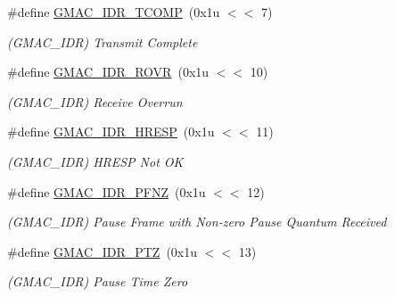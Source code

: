 \begin{DoxyCompactItemize}
\mbox{\label{group__SAMV71__GMAC_ga66627979744c990f93143b1dfcd2f9b6}} 
\#define \mbox{\hyperlink{group__SAMV71__GMAC_ga66627979744c990f93143b1dfcd2f9b6}{G\+M\+A\+C\+\_\+\+I\+D\+R\+\_\+\+T\+C\+O\+MP}}~(0x1u $<$$<$ 7)
\begin{DoxyCompactList}\small\item\em (G\+M\+A\+C\+\_\+\+I\+DR) Transmit Complete \end{DoxyCompactList}\item 
\mbox{\label{group__SAMV71__GMAC_ga6babb73eca9b6745dac4d0be12d2d8d1}} 
\#define \mbox{\hyperlink{group__SAMV71__GMAC_ga6babb73eca9b6745dac4d0be12d2d8d1}{G\+M\+A\+C\+\_\+\+I\+D\+R\+\_\+\+R\+O\+VR}}~(0x1u $<$$<$ 10)
\begin{DoxyCompactList}\small\item\em (G\+M\+A\+C\+\_\+\+I\+DR) Receive Overrun \end{DoxyCompactList}\item 
\mbox{\label{group__SAMV71__GMAC_ga54dea95c6d106159e8634137bcb194cb}} 
\#define \mbox{\hyperlink{group__SAMV71__GMAC_ga54dea95c6d106159e8634137bcb194cb}{G\+M\+A\+C\+\_\+\+I\+D\+R\+\_\+\+H\+R\+E\+SP}}~(0x1u $<$$<$ 11)
\begin{DoxyCompactList}\small\item\em (G\+M\+A\+C\+\_\+\+I\+DR) H\+R\+E\+SP Not OK \end{DoxyCompactList}\item 
\mbox{\label{group__SAMV71__GMAC_ga8b3327b90bee0982e2e72f3b99245239}} 
\#define \mbox{\hyperlink{group__SAMV71__GMAC_ga8b3327b90bee0982e2e72f3b99245239}{G\+M\+A\+C\+\_\+\+I\+D\+R\+\_\+\+P\+F\+NZ}}~(0x1u $<$$<$ 12)
\begin{DoxyCompactList}\small\item\em (G\+M\+A\+C\+\_\+\+I\+DR) Pause Frame with Non-\/zero Pause Quantum Received \end{DoxyCompactList}\item 
\mbox{\label{group__SAMV71__GMAC_ga3e738709c18a6afa68c2bf5f6e026e62}} 
\#define \mbox{\hyperlink{group__SAMV71__GMAC_ga3e738709c18a6afa68c2bf5f6e026e62}{G\+M\+A\+C\+\_\+\+I\+D\+R\+\_\+\+P\+TZ}}~(0x1u $<$$<$ 13)
\begin{DoxyCompactList}\small\item\em (G\+M\+A\+C\+\_\+\+I\+DR) Pause Time Zero \end{DoxyCompactList}\item 
$$
\end{DoxyCompactItemize}
